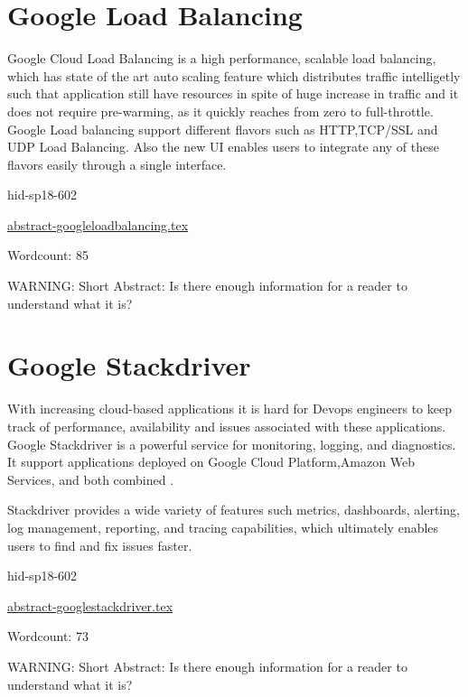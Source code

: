 \section{Google Load Balancing}

Google Cloud Load Balancing is a high performance, scalable load balancing, 
which has state of the art auto scaling feature which distributes traffic 
intelligetly such that application still have resources in spite of huge increase 
in traffic and it does not require pre-warming, as it quickly reaches 
from zero to full-throttle. 
Google Load balancing support different flavors such as HTTP,TCP/SSL and UDP 
Load Balancing\cite{hid-sp18-602-www-loadbalancing-main}. Also the new UI enables users to integrate any of these flavors 
easily through a single interface.



\begin{IU}

hid-sp18-602

\href{https://github.com/cloudmesh-community/hid-sp18-602/blob/master//technology/abstract-googleloadbalancing.tex}{abstract-googleloadbalancing.tex}

 

Wordcount: 85

WARNING: Short Abstract: Is there enough information for a reader to understand what it is?

\end{IU}

\section{Google Stackdriver}

With increasing cloud-based applications it is hard for Devops engineers to keep
track of performance, availability and issues associated with these applications.
Google Stackdriver is a powerful service for monitoring, logging, and diagnostics. 
It support applications deployed on Google Cloud Platform,Amazon Web Services, and both combined
\cite{hid-sp18-602-www-google-stackdriver-main}.

Stackdriver provides a wide variety of features such metrics, dashboards, 
alerting, log management, reporting, and tracing capabilities, which 
ultimately enables users to find and fix issues faster\cite{hid-sp18-602-www-google-stackdriver-main}. 


\begin{IU}

hid-sp18-602

\href{https://github.com/cloudmesh-community/hid-sp18-602/blob/master//technology/abstract-googlestackdriver.tex}{abstract-googlestackdriver.tex}

 

Wordcount: 73

WARNING: Short Abstract: Is there enough information for a reader to understand what it is?

\end{IU}

